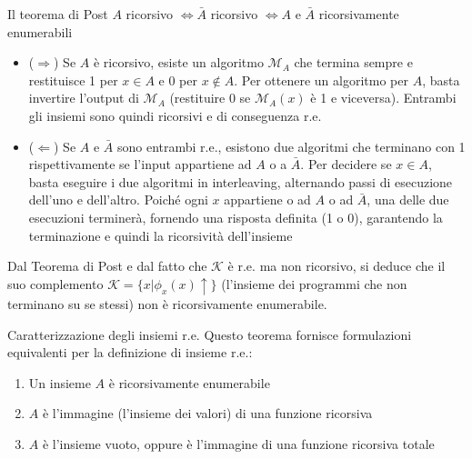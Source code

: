 \documentclass[12pt, a4paper]{report}
\begin{document}
                    \begin{theorembox}{Il teorema di Post}{}
                        $A$ ricorsivo $\iff\bar{A}$ ricorsivo $\iff A$ e $\bar{A}$ ricorsivamente enumerabili
                    \end{theorembox}
                    \begin{demonstration}
                        \begin{itemize}
                            \item ($\Rightarrow$) Se $A$ è ricorsivo, esiste un algoritmo $\mathcal{M}_A$ che termina sempre e restituisce 1 per $x \in A$ e 0 per $x \notin A$. Per ottenere un algoritmo per $A$, basta invertire l'output di $\mathcal{M}_A$ (restituire 0 se $\mathcal{M}_A(x)$ è 1 e viceversa). Entrambi gli insiemi sono quindi ricorsivi e di conseguenza r.e.
                            \item ($\Leftarrow$) Se $A$ e $\bar{A}$ sono entrambi r.e., esistono due algoritmi che terminano con 1 rispettivamente se l'input appartiene ad $A$ o a $\bar{A}$. Per decidere se $x \in A$, basta eseguire i due algoritmi in interleaving, alternando passi di esecuzione dell'uno e dell'altro. Poiché ogni $x$ appartiene o ad $A$ o ad $\bar{A}$, una delle due esecuzioni terminerà, fornendo una risposta definita (1 o 0), garantendo la terminazione e quindi la ricorsività dell'insieme
                        \end{itemize}
                    \end{demonstration}
                    Dal Teorema di Post e dal fatto che $\mathcal{K}$ è r.e. ma non ricorsivo, si deduce che il suo complemento $\mathcal{K} = \{x | \phi_x(x)\uparrow\}$ (l'insieme dei programmi che non terminano su se stessi) non è ricorsivamente enumerabile.
                    \begin{theorembox}{Caratterizzazione degli insiemi r.e.}{}
                        Questo teorema fornisce formulazioni equivalenti per la definizione di insieme r.e.:
                        \begin{enumerate}
                            \item Un insieme $A$ è ricorsivamente enumerabile
                            \item $A$ è l'immagine (l'insieme dei valori) di una funzione ricorsiva
                            \item $A$ è l'insieme vuoto, oppure è l'immagine di una funzione ricorsiva totale
                        \end{enumerate}
                    \end{theorembox}
\end{document}

